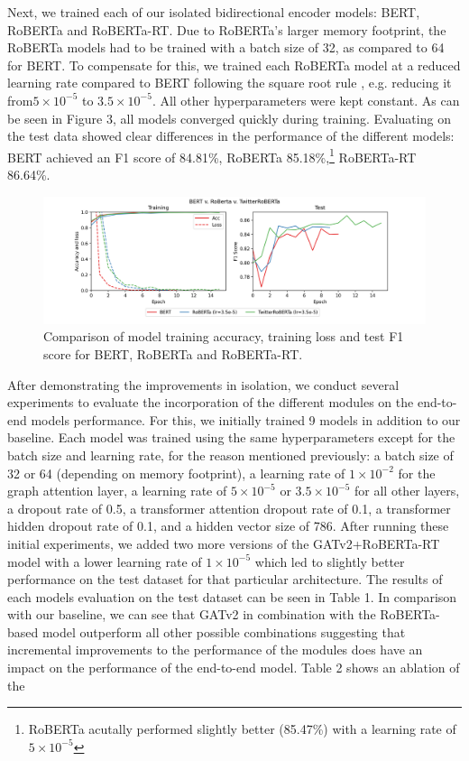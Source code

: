 \documentclass[letterpaper]{article} %
\begin{document}
Next, we trained each of our isolated bidirectional encoder models: BERT, RoBERTa and RoBERTa-RT. Due to RoBERTa's larger memory footprint, the RoBERTa models had to be trained with a batch size of 32, as compared to 64 for BERT. To compensate for this, we trained each RoBERTa model at a reduced learning rate compared to BERT following the square root rule \citep{Granziol2022}, e.g. reducing it from$5\times 10^{-5}$ to $3.5\times 10^{-5}$. All other hyperparameters were kept constant. As can be seen in Figure 3, all models converged quickly during training. Evaluating on the test data showed clear differences in the performance of the different models: BERT achieved an F1 score of 84.81\%, RoBERTa 85.18\%,\footnote{RoBERTa acutally performed slightly better (85.47\%) with a learning rate of $5\times 10^{-5}$} RoBERTa-RT 86.64\%.

\begin{figure}[!h]
    \includegraphics[width=\linewidth]{all_berts.png}
    \caption{Comparison of model training accuracy, training loss and test F1 score for BERT, RoBERTa and RoBERTa-RT.}
\end{figure}

After demonstrating the improvements in isolation, we conduct several experiments to evaluate the incorporation of the different modules on the end-to-end models performance. For this, we initially trained 9 models in addition to our baseline. Each model was trained using the same hyperparameters except for the batch size and learning rate, for the reason mentioned previously: a batch size of 32 or 64 (depending on memory footprint), a learning rate of $1\times 10^{-2}$ for the graph attention layer, a learning rate of $5\times 10^{-5}$ or $3.5\times 10^{-5}$ for all other layers, a dropout rate of 0.5, a transformer attention dropout rate of 0.1, a transformer hidden dropout rate of 0.1, and a hidden vector size of 786. After running these initial experiments, we added two more versions of the GATv2+RoBERTa-RT model with a lower learning rate of $1\times 10^{-5}$ which led to slightly better performance on the test dataset for that particular architecture. The results of each models evaluation on the test dataset can be seen in Table 1. In comparison with our baseline, we can see that GATv2 in combination with the RoBERTa-based model outperform all other possible combinations suggesting that incremental improvements to the performance of the modules does have an impact on the performance of the end-to-end model. Table 2 shows an ablation of the    
\end{document}

